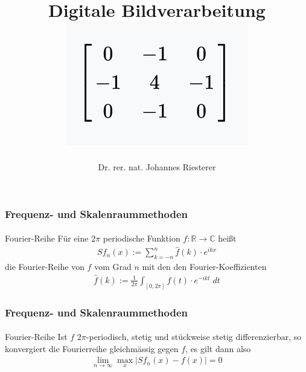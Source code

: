 \documentclass{beamer}
\begin{document}
\title[Digitale Bildverarbeitung] %
{Digitale Bildverarbeitung
\\
\includegraphics[scale=1.0]{img/cover}
}
\subtitle{}
\author[Dr. Johannes Riesterer] %
{Dr.  rer. nat. Johannes Riesterer}

\date[KPT 2004] %
{}

\subject{Digitale Bildverarbeitung}

\frame{\titlepage}


\begin{frame}
    \frametitle{Frequenz- und Skalenraummethoden}
\framesubtitle{}

\begin{block}{Fourier-Reihe}
Für eine $2\pi$ periodische Funktion $f: \mathbb{R} \to \mathbb{C}$  heißt 
\begin{align*}
Sf_n(x) := \sum_{k= -n}^{n} \hat{f}(k) \cdot e^{ikx} 
\end{align*}
die Fourier-Reihe von $f$ vom Grad $n$ mit den den Fourier-Koeffizienten
\begin{align*}
\hat{f}(k) := \frac{1}{2 \pi} \int_{[0, 2 \pi]} f(t) \cdot e^{-ikt} \; dt
\end{align*}
\end{block}

 \end{frame}


\begin{frame}
    \frametitle{Frequenz- und Skalenraummethoden}
\framesubtitle{}

\begin{block}{Fourier-Reihe}
Ist $f$  $2\pi$-periodisch,  stetig und stückweise stetig differenzierbar, so konvergiert die Fourierreihe gleichmässig gegen $f$, es gilt dann also 
\begin{align*}
\lim_{n \to \infty} \max_x |Sf_n(x) -f(x) | = 0
\end{align*}
\end{block}

 \end{frame}
\end{document}
